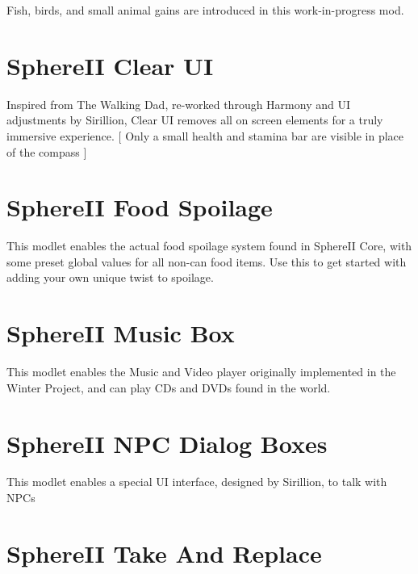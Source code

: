 Fish, birds, and small animal gains are introduced in this work-\/in-\/progress mod.\hypertarget{md__c_1__users_jkilpatrick__documents__git_hub__sphere_i_i_8_mods__r_e_a_d_m_e_autotoc_md10}{}\section{Sphere\+I\+I Clear UI}\label{md__c_1__users_jkilpatrick__documents__git_hub__sphere_i_i_8_mods__r_e_a_d_m_e_autotoc_md10}
Inspired from The Walking Dad, re-\/worked through Harmony and UI adjustments by Sirillion, Clear UI removes all on screen elements for a truly immersive experience. \mbox{[} Only a small health and stamina bar are visible in place of the compass \mbox{]}\hypertarget{md__c_1__users_jkilpatrick__documents__git_hub__sphere_i_i_8_mods__r_e_a_d_m_e_autotoc_md11}{}\section{Sphere\+I\+I Food Spoilage}\label{md__c_1__users_jkilpatrick__documents__git_hub__sphere_i_i_8_mods__r_e_a_d_m_e_autotoc_md11}
This modlet enables the actual food spoilage system found in Sphere\+II Core, with some preset global values for all non-\/can food items. Use this to get started with adding your own unique twist to spoilage.\hypertarget{md__c_1__users_jkilpatrick__documents__git_hub__sphere_i_i_8_mods__r_e_a_d_m_e_autotoc_md12}{}\section{Sphere\+I\+I Music Box}\label{md__c_1__users_jkilpatrick__documents__git_hub__sphere_i_i_8_mods__r_e_a_d_m_e_autotoc_md12}
This modlet enables the Music and Video player originally implemented in the Winter Project, and can play C\+Ds and D\+V\+Ds found in the world.\hypertarget{md__c_1__users_jkilpatrick__documents__git_hub__sphere_i_i_8_mods__r_e_a_d_m_e_autotoc_md13}{}\section{Sphere\+I\+I N\+P\+C Dialog Boxes}\label{md__c_1__users_jkilpatrick__documents__git_hub__sphere_i_i_8_mods__r_e_a_d_m_e_autotoc_md13}
This modlet enables a special UI interface, designed by Sirillion, to talk with N\+P\+Cs\hypertarget{md__c_1__users_jkilpatrick__documents__git_hub__sphere_i_i_8_mods__r_e_a_d_m_e_autotoc_md14}{}\section{Sphere\+I\+I Take And Replace}\label{md__c_1__users_jkilpatrick__documents__git_hub__sphere_i_i_8_mods__r_e_a_d_m_e_autotoc_md14}
